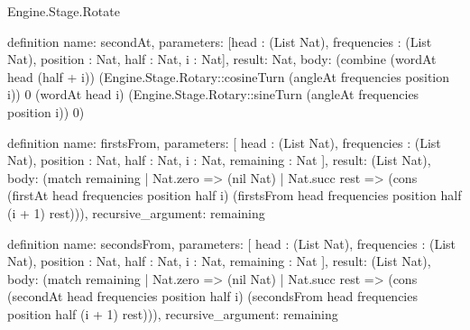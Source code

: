\begin{lexlean}{Engine.Stage.Rotate}
\begin{semanticmodule}
definition{
  name: secondAt,
  parameters: [head : (List Nat), frequencies : (List Nat), position : Nat, half : Nat, i : Nat],
  result: Nat,
  body: (combine (wordAt head (half + i)) (Engine.Stage.Rotary::cosineTurn (angleAt frequencies position i)) 0 (wordAt head i) (Engine.Stage.Rotary::sineTurn (angleAt frequencies position i)) 0)
}

definition{
  name: firstsFrom,
  parameters: [
    head : (List Nat),
    frequencies : (List Nat),
    position : Nat,
    half : Nat,
    i : Nat,
    remaining : Nat
  ],
  result: (List Nat),
  body: (match remaining
    | Nat.zero => (nil Nat)
    | Nat.succ rest => (cons (firstAt head frequencies position half i) (firstsFrom head frequencies position half (i + 1) rest))),
  recursive_argument: remaining
}

definition{
  name: secondsFrom,
  parameters: [
    head : (List Nat),
    frequencies : (List Nat),
    position : Nat,
    half : Nat,
    i : Nat,
    remaining : Nat
  ],
  result: (List Nat),
  body: (match remaining
    | Nat.zero => (nil Nat)
    | Nat.succ rest => (cons (secondAt head frequencies position half i) (secondsFrom head frequencies position half (i + 1) rest))),
  recursive_argument: remaining
}
\end{semanticmodule}
\end{lexlean}
